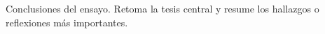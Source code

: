 \documentclass[12pt, a4paper]{report}
\begin{document}
Conclusiones del ensayo. Retoma la tesis central y resume los hallazgos
o reflexiones más importantes.

\printbibliography[heading=bibintoc, title={Referencias}]

\end{document}
